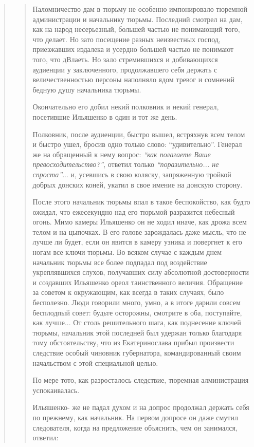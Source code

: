 \begin{quote}
\begin{quote}
Паломничество дам в тюрьму не особенно импонировало тюремной администрации и
начальнику тюрьмы. Последний смотрел на дам, как на народ несерьезный, большей
частью не понимающий того, что делает.  Но зато посещение разных неизвестных
господ, приезжавших издалека и усердно большей частью не понимают того, что
дВлаеть. Но зало стремившихся и добивающихся аудиенции у заключенного,
продолжавшего себя держать с величественностью персоны наполняло ядом тревог и
сомнений бедную душу начальника тюрьмы.

Окончательно его добил некий полковник и некий генерал, посетившие Ильяшенко в
один и тот же день.

Полковник, после аудиенции, быстро вышел, встряхнув всем телом и быстро ушел,
бросив одно только слово: ``удивительно''. Генерал же на обращенный к нему
вопрос: \emph{``как полагаете Ваше превосходительство?''}, ответил только
\emph{``поразительно... не спроста''}... и, усевшись в свою коляску, запряженную
тройкой добрых донских коней, укатил в свое имение на донскую сторону.

После этого начальник тюрьмы впал в такое беспокойство, как будто ожидал, что
ежесекундно над его тюрьмой разразится небесный огонь. Мимо камеры Ильяшенко он
не ходил иначе, как дрожа всем телом и на цыпочках.  В его голове зарождалась
даже мысль, что не лучше ли будет, если он явится в камеру узника и повергнет к
его ногам все ключи тюрьмы. Во всяком случае с каждым днем начальник тюрьмы все
более подпадал под воздействие укреплявшихся слухов, получавших силу абсолютной
достоверности и создавших Ильяшенко ореол таинственного величия. Обращение за
советом к окружающим, как всегда в таких случаях, было бесполезно.
Люди говорили много, умно, а в итоге дарили совсем бесплодпый совет: будьте
осторожны, смотрите в оба, поступайте, как лучше... От столь решительного шага,
как поднесение ключей тюрьмы, начальник этой последней был удержан только
благодаря тому обстоятельству, что из Екатеринослава прибыл произвести
следствие особый чиновник губернатора, командированный своим начальством с этой
специальной целью.

По мере тото, как разросталось следствие, тюремная
алминистрация успокаивалась.

Ильяшенко- же не падал духом и на допрос продолжал держать себя по прежнему, как начальник.
На первом допросе он даже смутил следователя, когда на предложение объяснить, чем он занимался, ответил:


\end{quote}
\end{quote}
